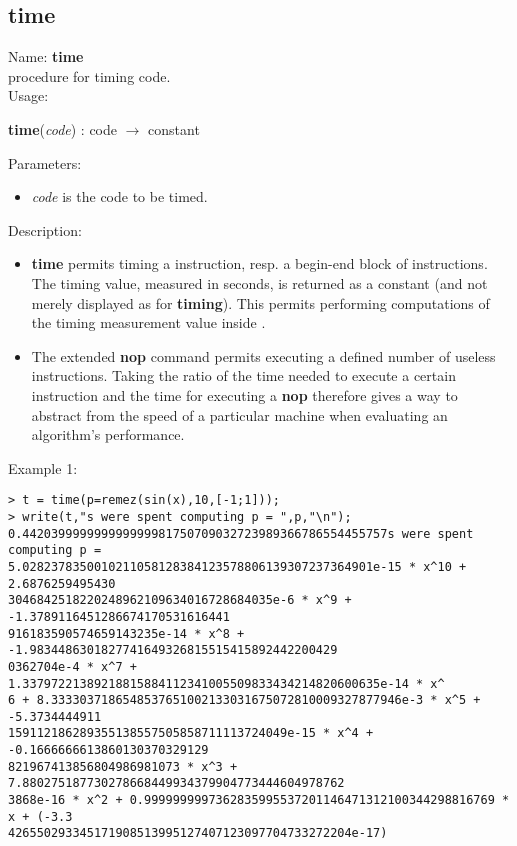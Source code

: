 \subsection{time}
\label{labtime}
\noindent Name: \textbf{time}\\
\phantom{aaa}procedure for timing \sollya code.\\[0.2cm]
\noindent Usage: 
\begin{center}
\textbf{time}(\emph{code}) : \textsf{code} $\rightarrow$ \textsf{constant}\\
\end{center}
Parameters: 
\begin{itemize}
\item \emph{code} is the code to be timed.
\end{itemize}
\noindent Description: \begin{itemize}

\item \textbf{time} permits timing a \sollya instruction, resp. a begin-end block
   of \sollya instructions. The timing value, measured in seconds, is returned
   as a \sollya constant (and not merely displayed as for \textbf{timing}). This 
   permits performing computations of the timing measurement value inside \sollya.

\item The extended \textbf{nop} command permits executing a defined number of
   useless instructions. Taking the ratio of the time needed to execute a
   certain \sollya instruction and the time for executing a \textbf{nop}
   therefore gives a way to abstract from the speed of a particular 
   machine when evaluating an algorithm's performance.
\end{itemize}
\noindent Example 1: 
\begin{center}\begin{minipage}{15cm}\begin{Verbatim}[frame=single]
> t = time(p=remez(sin(x),10,[-1;1]));
> write(t,"s were spent computing p = ",p,"\n");
0.442039999999999999981750709032723989366786554455757s were spent computing p = 
5.0282378350010211058128384123578806139307237364901e-15 * x^10 + 2.6876259495430
3046842518220248962109634016728684035e-6 * x^9 + -1.3789116451286674170531616441
916183590574659143235e-14 * x^8 + -1.9834486301827741649326815515415892442200429
0362704e-4 * x^7 + 1.33797221389218815884112341005509833434214820600635e-14 * x^
6 + 8.3333037186548537651002133031675072810009327877946e-3 * x^5 + -5.3734444911
159112186289355138557505858711113724049e-15 * x^4 + -0.1666666613860130370329129
821967413856804986981073 * x^3 + 7.880275187730278668449934379904773444604978762
3868e-16 * x^2 + 0.9999999997362835995537201146471312100344298816769 * x + (-3.3
426550293345171908513995127407123097704733272204e-17)
\end{Verbatim}
\end{minipage}\end{center}
